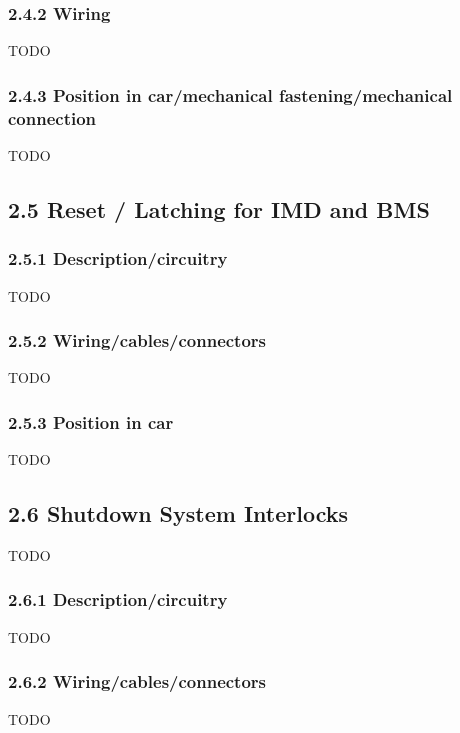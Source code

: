 \documentclass{article}
\begin{document}
\subsubsection*{2.4.2 Wiring}
TODO

\subsubsection*{2.4.3 Position in car/mechanical fastening/mechanical connection}
TODO

\subsection*{2.5 Reset / Latching for IMD and BMS}
\subsubsection*{2.5.1 Description/circuitry}
TODO

\subsubsection*{2.5.2 Wiring/cables/connectors}
TODO

\subsubsection*{2.5.3 Position in car}
TODO

\subsection*{2.6 Shutdown System Interlocks}
TODO

\subsubsection*{2.6.1 Description/circuitry}
TODO

\subsubsection*{2.6.2 Wiring/cables/connectors}
TODO
\end{document}
